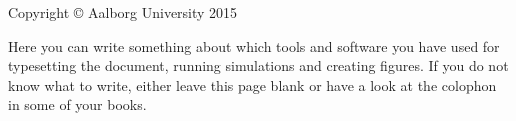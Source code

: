 \thispagestyle{empty}
{\small
\strut\vfill %
\noindent Copyright \copyright{} Aalborg University 2015\par
\vspace{0.2cm}
\noindent Here you can write something about which tools and software you have used for typesetting the document, running simulations and creating figures. If you do not know what to write, either leave this page blank or have a look at the colophon in some of your books.
}
\clearpage

